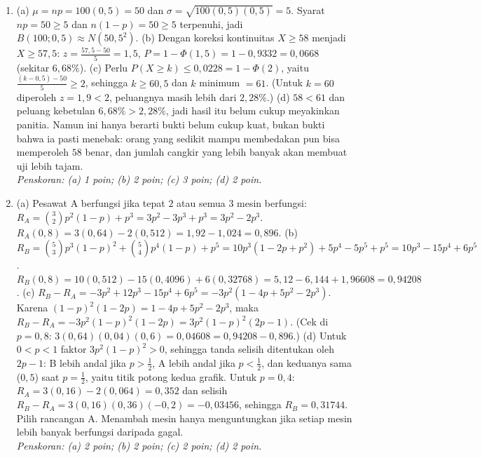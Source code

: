 \documentclass[a4paper,11pt]{article}
\newcounter{no}
\begin{document}
\begin{enumerate}[leftmargin=2em,itemsep=3pt,topsep=2pt]
\item[\textbf{4.}] (a) $\mu=np=100(0{,}5)=50$ dan $\sigma=\sqrt{100(0{,}5)(0{,}5)}=5$. Syarat $np=50\ge5$ dan $n(1-p)=50\ge5$ terpenuhi, jadi $B(100;0{,}5)\approx N(50,5^2)$. (b) Dengan koreksi kontinuitas $X\ge58$ menjadi $X\ge57{,}5$: $z=\frac{57{,}5-50}{5}=1{,}5$, $P=1-\Phi(1{,}5)=1-0{,}9332=0{,}0668$ (sekitar $6{,}68\%$). (c) Perlu $P(X\ge k)\le0{,}0228=1-\Phi(2)$, yaitu $\frac{(k-0{,}5)-50}{5}\ge2$, sehingga $k\ge60{,}5$ dan $k$ minimum $=61$. (Untuk $k=60$ diperoleh $z=1{,}9<2$, peluangnya masih lebih dari $2{,}28\%$.) (d) $58<61$ dan peluang kebetulan $6{,}68\%>2{,}28\%$, jadi hasil itu belum cukup meyakinkan panitia. Namun ini hanya berarti bukti belum cukup kuat, bukan bukti bahwa ia pasti menebak: orang yang sedikit mampu membedakan pun bisa memperoleh $58$ benar, dan jumlah cangkir yang lebih banyak akan membuat uji lebih tajam. \\ \textit{Penskoran: (a) 1 poin; (b) 2 poin; (c) 3 poin; (d) 2 poin.}
\item[\textbf{5.}] (a) Pesawat A berfungsi jika tepat $2$ atau semua $3$ mesin berfungsi: $R_A=\binom32p^2(1-p)+p^3=3p^2-3p^3+p^3=3p^2-2p^3$. $R_A(0{,}8)=3(0{,}64)-2(0{,}512)=1{,}92-1{,}024=0{,}896$. (b) $R_B=\binom53p^3(1-p)^2+\binom54p^4(1-p)+p^5=10p^3(1-2p+p^2)+5p^4-5p^5+p^5=10p^3-15p^4+6p^5$. $R_B(0{,}8)=10(0{,}512)-15(0{,}4096)+6(0{,}32768)=5{,}12-6{,}144+1{,}96608=0{,}94208$. (c) $R_B-R_A=-3p^2+12p^3-15p^4+6p^5=-3p^2(1-4p+5p^2-2p^3)$. Karena $(1-p)^2(1-2p)=1-4p+5p^2-2p^3$, maka $R_B-R_A=-3p^2(1-p)^2(1-2p)=3p^2(1-p)^2(2p-1)$. (Cek di $p=0{,}8$: $3(0{,}64)(0{,}04)(0{,}6)=0{,}04608=0{,}94208-0{,}896$.) (d) Untuk $0<p<1$ faktor $3p^2(1-p)^2>0$, sehingga tanda selisih ditentukan oleh $2p-1$: B lebih andal jika $p>\frac12$, A lebih andal jika $p<\frac12$, dan keduanya sama ($0{,}5$) saat $p=\frac12$, yaitu titik potong kedua grafik. Untuk $p=0{,}4$: $R_A=3(0{,}16)-2(0{,}064)=0{,}352$ dan selisih $R_B-R_A=3(0{,}16)(0{,}36)(-0{,}2)=-0{,}03456$, sehingga $R_B=0{,}31744$. Pilih rancangan A. Menambah mesin hanya menguntungkan jika setiap mesin lebih banyak berfungsi daripada gagal. \\ \textit{Penskoran: (a) 2 poin; (b) 2 poin; (c) 2 poin; (d) 2 poin.}
\end{enumerate}
\end{document}
